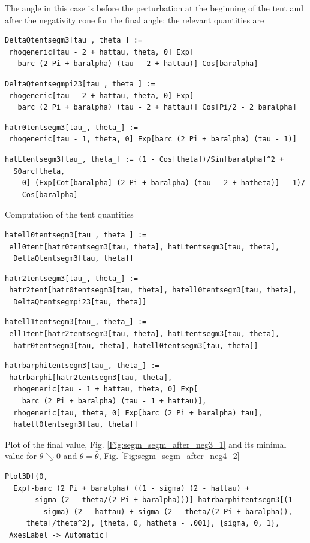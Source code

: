 \documentclass[reqno]{amsart}
\theoremstyle{definition} \newtheorem{definition}{Definition}[section]
\theoremstyle{definition} \newtheorem{remark}[definition]{Remark}
\theoremstyle{plain} \newtheorem{lemma}[definition]{Lemma}
\theoremstyle{plain} \newtheorem{proposition}[definition]{Proposition}
\theoremstyle{plain} \newtheorem{theorem}[definition]{Theorem}
\theoremstyle{plain} \newtheorem{corollary}[definition]{Corollary}
\theoremstyle{definition} \newtheorem{example}[definition]{Example}
\theoremstyle{plain} \newtheorem{claim}[clai]{Claim}
\theoremstyle{definition} \newtheorem{assumption}[definition]{Assumption}
\theoremstyle{definition} \newtheorem{observation}[definition]{Observation}
\newcommand{\1}{\mathbbm 1}
\newcommand{\smed}{\medskip}
\numberwithin{equation}{section} %
\theoremstyle{plain} \newtheorem*{theorem*}{Theorem}
\theoremstyle{plain} \newtheorem{mthm}[maintheorem]{Main Theorem}
\theoremstyle{plain} \newtheorem*{mthm*}{Main Theorem}
\theoremstyle{plain} \newtheorem*{conjecture*}{Conjecture}
\theoremstyle{plain} \newtheorem{conjecture}[definition]{Conjecture}
\theoremstyle{plain} \newtheorem*{problem*}{Problem}
\begin{document}
\noindent The angle in this case is before the perturbation at the beginning of the tent and after the negativity cone for the final angle: the relevant quantities are
\smed
\begin{verbatim}
DeltaQtentsegm3[tau_, theta_] := 
 rhogeneric[tau - 2 + hattau, theta, 0] Exp[
   barc (2 Pi + baralpha) (tau - 2 + hattau)] Cos[baralpha]
\end{verbatim}
\begin{verbatim}
DeltaQtentsegmpi23[tau_, theta_] := 
 rhogeneric[tau - 2 + hattau, theta, 0] Exp[
   barc (2 Pi + baralpha) (tau - 2 + hattau)] Cos[Pi/2 - 2 baralpha]
\end{verbatim}
\begin{verbatim}
hatr0tentsegm3[tau_, theta_] := 
 rhogeneric[tau - 1, theta, 0] Exp[barc (2 Pi + baralpha) (tau - 1)]
\end{verbatim}
\begin{verbatim}
hatLtentsegm3[tau_, theta_] := (1 - Cos[theta])/Sin[baralpha]^2 + 
  S0arc[theta, 
    0] (Exp[Cot[baralpha] (2 Pi + baralpha) (tau - 2 + hatheta)] - 1)/
    Cos[baralpha]
\end{verbatim}
\smed
Computation of the tent quantities
\smed
\begin{verbatim}
hatell0tentsegm3[tau_, theta_] := 
 ell0tent[hatr0tentsegm3[tau, theta], hatLtentsegm3[tau, theta], 
  DeltaQtentsegm3[tau, theta]]
\end{verbatim}
\begin{verbatim}
hatr2tentsegm3[tau_, theta_] := 
 hatr2tent[hatr0tentsegm3[tau, theta], hatell0tentsegm3[tau, theta], 
  DeltaQtentsegmpi23[tau, theta]]
\end{verbatim}
\begin{verbatim}
hatell1tentsegm3[tau_, theta_] := 
 ell1tent[hatr2tentsegm3[tau, theta], hatLtentsegm3[tau, theta], 
  hatr0tentsegm3[tau, theta], hatell0tentsegm3[tau, theta]]
\end{verbatim}
\begin{verbatim}
hatrbarphitentsegm3[tau_, theta_] := 
 hatrbarphi[hatr2tentsegm3[tau, theta], 
  rhogeneric[tau - 1 + hattau, theta, 0] Exp[
    barc (2 Pi + baralpha) (tau - 1 + hattau)], 
  rhogeneric[tau, theta, 0] Exp[barc (2 Pi + baralpha) tau], 
  hatell0tentsegm3[tau, theta]]
\end{verbatim}
\smed
Plot of the final value, Fig. \ref{Fig:segm_segm_after_neg3_1} and its minimal value for $\theta \searrow 0$ and $\theta = \hat \theta$, Fig. \ref{Fig:segm_segm_after_neg4_2}
\smed
\begin{verbatim}
Plot3D[{0, 
  Exp[-barc (2 Pi + baralpha) ((1 - sigma) (2 - hattau) + 
       sigma (2 - theta/(2 Pi + baralpha)))] hatrbarphitentsegm3[(1 - 
         sigma) (2 - hattau) + sigma (2 - theta/(2 Pi + baralpha)), 
     theta]/theta^2}, {theta, 0, hatheta - .001}, {sigma, 0, 1}, 
 AxesLabel -> Automatic]
\end{verbatim}
\end{document}
